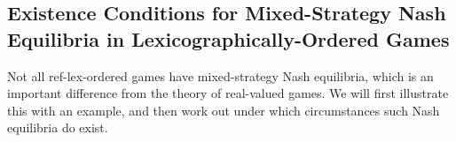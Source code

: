 \documentclass[a4paper]{scrreprt}
\theoremstyle{definition}
\begin{document}
    \subsection[Existence Conditions for Mixed-Strategy Nash Equilibria in\\ Lexicographically-Ordered Games]{Existence Conditions for Mixed-Strategy Nash Equilibria in Lexicographically-Ordered Games}
    Not all ref-lex-ordered games have mixed-strategy Nash equilibria, which is an important difference from the theory of real-valued games. We will first illustrate this with an example, and then work out under which circumstances such Nash equilibria do exist.
    
    \newcommand{\Gproj}[1]{G_{#1}}
    \newcommand{\Gprojsub}[1]{\bar{G}_{#1}}
    
\end{document}
